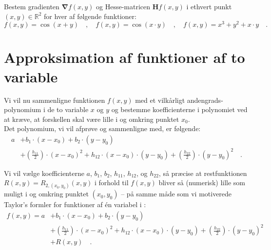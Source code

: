 \begin{exercise}\label{exercGradHess}
Bestem gradienten $\bm{\nabla}f(x,y)$ og Hesse-matricen $\mathbf{H}f(x,y)$ i ethvert punkt $(x,y) \in \mathbb{R}^{2}$ for hver af følgende funktioner:
\begin{equation}
f(x,y)= \cos(x+y)\quad , \quad f(x,y)= \cos(x\cdot y)  \quad , \quad f(x,y)= x^{3} + y^{2} + x\cdot y \quad .
\end{equation}
\end{exercise}

\section{Approksimation af funktioner af to variable}

Vi vil nu sammenligne funktionen $f(x,y)$  med et vilkårligt andengrads-polynomium i de to variable $x$ og $y$ og bestemme koefficienterne i polynomiet ved at
kræve, at forskellen skal være lille i og omkring punktet $x_{0}$. \\

Det polynomium, vi vil afprøve og sammenligne med,
er følgende:
\begin{equation}
\begin{aligned}
a &+ b_{1}\cdot (x-x_{0}) + b_{2}\cdot (y-y_{0}) \\
&+ \left( \frac{h_{11}}{2}\right)\cdot (x-x_{0})^{2} + h_{12}\cdot (x-x_{0})\cdot (y-y_{0}) + \left(\frac{h_{22}}{2}\right) \cdot (y-y_{0})^{2} \quad .
\end{aligned}
\end{equation}

Vi vil vælge koefficienterne  $a$, $b_{1}$, $b_{2}$, $h_{11}$, $h_{12}$, og $h_{22}$,  så præcise at restfunktionen $R(x,y)= R_{2, (x_{0}, y_{0})}(x,y)$ i forhold til $f(x,y)$ bliver så (numerisk) lille som muligt i og omkring punktet $(x_{0}, y_{0})$ -- på samme måde som vi motiverede Taylor's formler for funktioner af \'{e}n variabel i :
\begin{equation} \label{eqTaylorRaw}
\begin{aligned}
f(x,y) = a
&+ b_{1}\cdot (x-x_{0}) + b_{2}\cdot (y-y_{0}) \\
&+ \left( \frac{h_{11}}{2}\right)\cdot (x-x_{0})^{2} + h_{12}\cdot (x-x_{0})\cdot (y-y_{0}) + \left(\frac{h_{22}}{2}\right) \cdot (y-y_{0})^{2} \\
&+ R(x,y) \quad .
\end{aligned}
\end{equation}

